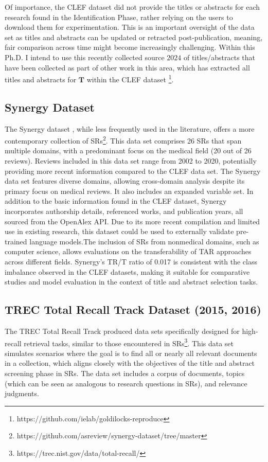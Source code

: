 \documentclass[10pt, english]{article}
\begin{document}
Of importance, the CLEF dataset did not provide the titles or abstracts for each research found in the Identification Phase, rather relying on the users to download them for experimentation. This is an important oversight of the data set as titles and abstracts can be updated or retracted post-publication, meaning, fair comparison across time might become increasingly challenging. Within this Ph.D. I intend to use this recently collected source \(2024\) of titles/abstracts that have been collected as part of other work in this area, which has extracted all titles and abstracts for \(\textbf{T}\) within the CLEF dataset \cite{goharian_reproducibility_2024}\footnote{https://github.com/ielab/goldilocks-reproduce}.

\subsection{Synergy Dataset}
The Synergy dataset \cite{de_bruin_synergy_2023}, while less frequently used in the literature, offers a more contemporary collection of SRs\footnote{https://github.com/asreview/synergy-dataset/tree/master}. This data set comprises 26 SRs that span multiple domains, with a predominant focus on the medical field (20 out of 26 reviews). Reviews included in this data set range from 2002 to 2020, potentially providing more recent information compared to the CLEF data set.
The Synergy data set features diverse domains, allowing cross-domain analysis despite its primary focus on medical reviews. It also includes an expanded variable set. In addition to the basic information found in the CLEF dataset, Synergy incorporates authorship details, referenced works, and publication years, all sourced from the OpenAlex API.
Due to its more recent compilation and limited use in existing research, this dataset could be used to externally validate pre-trained language models.The inclusion of SRs from nonmedical domains, such as computer science, allows evaluations on the transferability of TAR approaches across different fields.
Synergy's TR/T ratio of 0.017 is consistent with the class imbalance observed in the CLEF datasets, making it suitable for comparative studies and model evaluation in the context of title and abstract selection tasks.

\subsection{TREC Total Recall Track Dataset (2015, 2016)}
The TREC Total Recall Track produced data sets specifically designed for high-recall retrieval tasks, similar to those encountered in SRs\footnote{https://trec.nist.gov/data/total-recall/}\cite{roegiest_trec_2015, grossman_trec_2016}. This data set simulates scenarios where the goal is to find all or nearly all relevant documents in a collection, which aligns closely with the objectives of the title and abstract screening phase in SRs. The data set includes a corpus of documents, topics (which can be seen as analogous to research questions in SRs), and relevance judgments.
\end{document}
